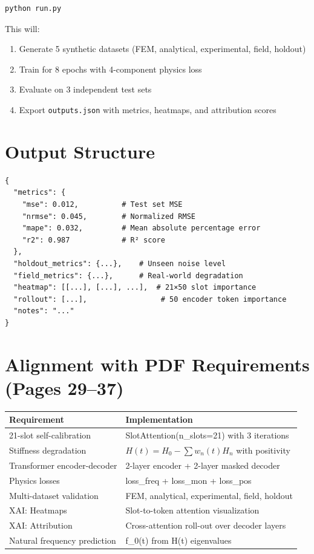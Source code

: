 \documentclass[11pt]{article}
\begin{document}
\begin{verbatim}
python run.py
\end{verbatim}

This will:
\begin{enumerate}
  \item Generate 5 synthetic datasets (FEM, analytical, experimental, field, holdout)
  \item Train for 8 epochs with 4-component physics loss
  \item Evaluate on 3 independent test sets
  \item Export \texttt{outputs.json} with metrics, heatmaps, and attribution scores
\end{enumerate}

\section{Output Structure}

\begin{verbatim}
{
  "metrics": {
    "mse": 0.012,          # Test set MSE
    "nrmse": 0.045,        # Normalized RMSE
    "mape": 0.032,         # Mean absolute percentage error
    "r2": 0.987            # R² score
  },
  "holdout_metrics": {...},    # Unseen noise level
  "field_metrics": {...},      # Real-world degradation
  "heatmap": [[...], [...], ...],  # 21×50 slot importance
  "rollout": [...],                 # 50 encoder token importance
  "notes": "..."
}
\end{verbatim}

\section{Alignment with PDF Requirements (Pages 29--37)}

\begin{tabular}{|l|l|}
\hline
\textbf{Requirement} & \textbf{Implementation} \\
\hline
21-slot self-calibration & SlotAttention(n\_slots=21) with 3 iterations \\
\hline
Stiffness degradation & $H(t) = H_0 - \sum w_n(t)H_n$ with positivity \\
\hline
Transformer encoder-decoder & 2-layer encoder + 2-layer masked decoder \\
\hline
Physics losses & loss\_freq + loss\_mon + loss\_pos \\
\hline
Multi-dataset validation & FEM, analytical, experimental, field, holdout \\
\hline
XAI: Heatmaps & Slot-to-token attention visualization \\
\hline
XAI: Attribution & Cross-attention roll-out over decoder layers \\
\hline
Natural frequency prediction & f\_0(t) from H(t) eigenvalues \\
\hline
\end{tabular}
\end{document}
